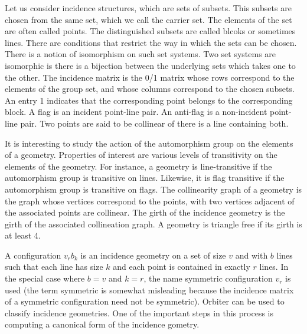 
Let us consider incidence structures, which are sets of subsets. 
This subsets are chosen from the same set, which we call the carrier set. 
The elements of the set are often called points.
The distinguished subsets are called blcoks or sometimes lines.
There are conditions that restrict the way in which the sets can be chosen. 
There is a notion of isomorphism on such set systems. 
Two set systems are isomorphic is there is a bijection between the underlying 
sets which takes one to the other. 
The incidence matrix is the 0/1 matrix whose rows correspond to the elements of the group set, 
and whose columns correspond to the chosen subsets. An entry 1 indicates that the 
corresponding point belongs to the corresponding block.
A flag is an incident point-line pair.
An anti-flag is a non-incident point-line pair.
Two points are said to be collinear of there is a line containing both.

\bigskip



It is interesting to study the action of the automorphism group on the elements of a geometry. 
Properties of interest are various levels of transitivity on the elements of the geometry. 
For instance, a geometry is line-transitive if the automorphism group is transitive on lines. 
Likewise, it is flag transitive if the automorphism group is transitive on flags.
The collinearity graph of a geometry is the graph whose vertices correspond to the points, 
with two vertices adjacent of the associated points are collinear.
The girth of the incidence geometry is the girth of the associated collineation graph. 
A geometry is triangle free if its girth is at least 4.



\bigskip


A configuration $v_r b_k$ is an incidence geometry 
on a set of size $v$ and with $b$ lines such that 
each line has size $k$ and each point is contained in exactly $r$ lines.
In the special case where $b=v$ and $k=r$, 
the name symmetric configuration $v_r$ is used 
(the term symmetric is somewhat misleading because the 
incidence matrix of a symmetric configuration need not be symmetric). 
Orbiter can be used to classify incidence geometries. 
One of the important steps in this process 
is computing a canonical form of the incidence gometry. 

\bigskip

